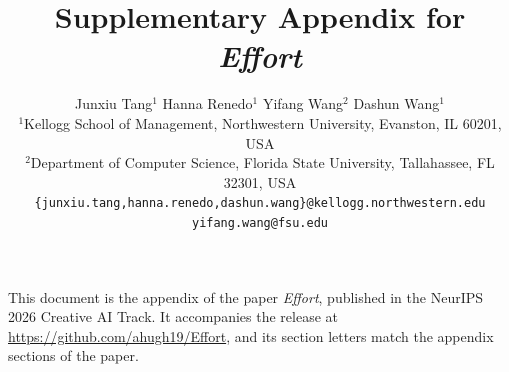 \documentclass{article}
\title{Supplementary Appendix for \emph{Effort}}
\author{%
  Junxiu Tang$^{1}$ \quad
  Hanna Renedo$^{1}$ \quad
  Yifang Wang$^{2}$ \quad
  Dashun Wang$^{1}$ \\
  $^{1}$Kellogg School of Management, Northwestern University,
  Evanston, IL 60201, USA \\
  $^{2}$Department of Computer Science, Florida State University,
  Tallahassee, FL 32301, USA \\
  \texttt{\{junxiu.tang,hanna.renedo,dashun.wang\}@kellogg.northwestern.edu} \\
  \texttt{yifang.wang@fsu.edu}
}
\begin{document}
\maketitle

\begingroup
\renewcommand{\thefootnote}{\fnsymbol{footnote}}
\endgroup
\setcounter{footnote}{0}

\noindent
This document is the appendix of the paper \emph{Effort}, published in the NeurIPS 2026 Creative AI Track.
It accompanies the release at \url{https://github.com/ahugh19/Effort}, and its section letters match the appendix sections of the paper.

\appendix




\end{document}
